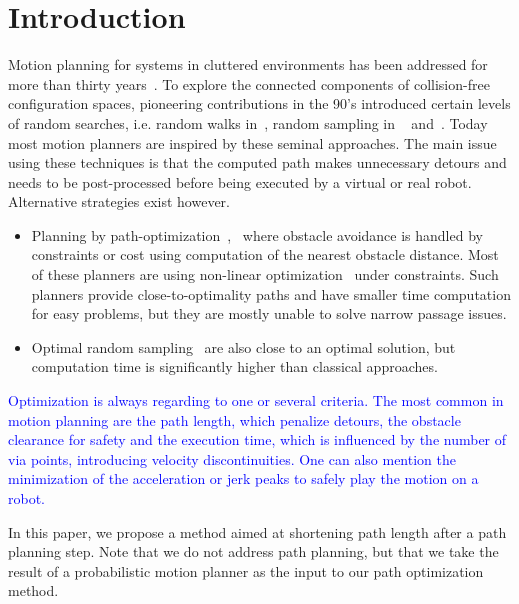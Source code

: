 \documentclass{tADR2e}
\begin{document}
\section{Introduction}
Motion planning for systems in cluttered environments has been addressed for more
than thirty years~\cite{ref-motionplan}. 
To explore the connected components of collision-free configuration spaces, pioneering 
contributions in the 90’s introduced certain levels of random searches, i.e. random walks in~\cite{potentielBarraquandLatombe}, random sampling in 
~\cite{KavrakiLatombePRM} and~\cite{LaValleKuffnerRRT}. Today most motion planners are inspired by these seminal approaches.
The main issue using these techniques is that the computed path makes unnecessary 
detours and needs to be post-processed before being executed by a virtual or real 
robot. Alternative strategies exist however.
\begin{itemize}
\item Planning by path-optimization~\cite{itomp2012},~\cite{voronoiOMP} where
obstacle avoidance is handled by constraints or cost using computation of the
nearest obstacle distance. Most of these planners are using non-linear
optimization~\cite{BettsNonlinopt} under constraints. Such planners provide close-to-optimality paths and have smaller time computation
for easy problems, but they are mostly unable to solve narrow passage issues.
 
\item Optimal random sampling~\cite{KaramanPRMstarRRTstar} are also close to an
optimal solution, but computation time is significantly higher than classical
approaches.
\end{itemize}

\textcolor{blue}{Optimization is always regarding to one or several criteria. The most common in motion planning are the path length, which penalize detours, the obstacle clearance for safety and the execution time, which is influenced by the number of via points, introducing velocity discontinuities. One can also mention the minimization of the acceleration or jerk peaks to safely play the motion on a robot.}

In this paper, we propose a method aimed at shortening path length after a path
planning step. Note that we do not address path planning, but that we take the
result of a probabilistic motion planner as the input to our path optimization 
method.
\end{document}
